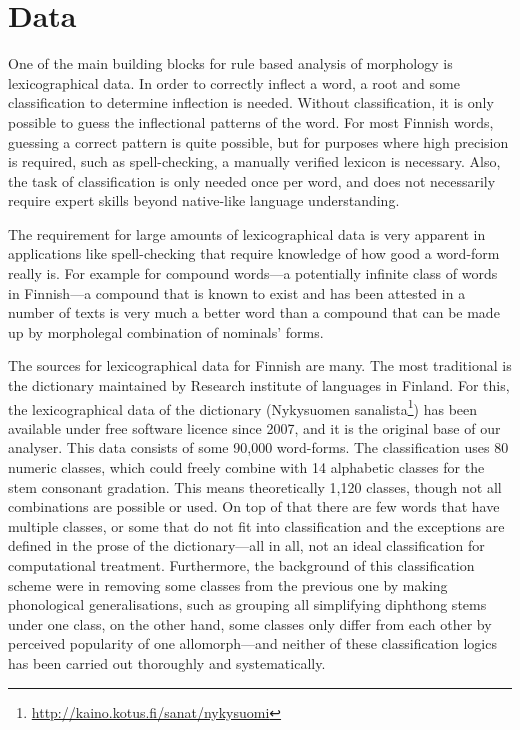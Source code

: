 \documentclass[a4paper,12pt]{article}
\begin{document}
\section{Data}

One of the main building blocks for rule based analysis of morphology is
lexicographical data. In order to correctly inflect a word, a root and some
classification to determine inflection is needed. Without classification, it is
only possible to guess the inflectional patterns of the word. For most Finnish
words, guessing a correct pattern is quite possible, but for purposes where
high precision is required, such as spell-checking, a manually verified lexicon
is necessary. Also, the task of classification is only needed once per word,
and does not necessarily require expert skills beyond native-like language
understanding.

The requirement for large amounts of lexicographical data is very apparent in
applications like spell-checking that require knowledge of how good a word-form
really is. For example for compound words---a potentially infinite class of
words in Finnish---a compound that is known to exist and has been attested in
a number of texts is very much a better word than a compound that can be made
up by morpholegal combination of nominals' forms.

The sources for lexicographical data for Finnish are many. The most traditional
is the dictionary maintained by Research institute of languages in Finland. For
this, the lexicographical data of the dictionary (Nykysuomen
sanalista\footnote{\url{http://kaino.kotus.fi/sanat/nykysuomi}}) has been
available under free software licence since 2007, and it is the original base
of our analyser. This data consists of some 90,000 word-forms. The
classification uses 80 numeric classes, which could freely combine with 14
alphabetic classes for the stem consonant gradation.  This means theoretically
1,120 classes, though not all combinations are possible or used. On top of that
there are few words that have multiple classes, or some that do not fit into
classification and the exceptions are defined in the prose of the
dictionary---all in all, not an ideal classification for computational
treatment. Furthermore, the background of this classification scheme were in
removing some classes from the previous one by making phonological
generalisations, such as grouping all simplifying diphthong stems under one
class, on the other hand, some classes only differ from each other by perceived
popularity of one allomorph---and neither of these classification logics has
been carried out thoroughly and systematically.
\end{document}
